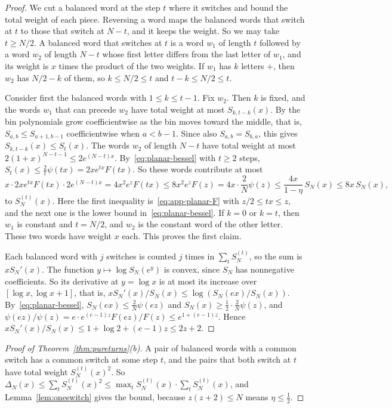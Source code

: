 \begin{proof}
We cut a balanced word at the step $t$ where it switches and bound the total weight of each piece.
Reversing a word maps the balanced words that switch at $t$ to those that switch at $N-t$, and it
keeps the weight. So we may take $t\ge N/2$. A balanced word that switches at $t$ is a word $w_1$
of length $t$ followed by a word $w_2$ of length $N-t$ whose first letter differs from the last
letter of $w_1$, and its weight is $x$ times the product of the two weights. If $w_1$ has $k$
letters $+$, then $w_2$ has $N/2-k$ of them, so $k\le N/2\le t$ and $t-k\le N/2\le t$.

Consider first the balanced words with $1\le k\le t-1$. Fix $w_2$. Then $k$ is fixed, and the
words $w_1$ that can precede $w_2$ have total weight at most $S_{k,t-k}(x)$. By
\cite[Proposition~4.1]{paperA} the bin polynomials grow coefficientwise as the bin moves toward the
middle, that is, $S_{a,b}\le S_{a+1,b-1}$ coefficientwise when $a<b-1$. Since also
$S_{a,b}=S_{b,a}$, this gives $S_{k,t-k}(x)\le S_t(x)$. The words $w_2$ of length $N-t$ have total
weight at most $2(1+x)^{N-t-1}\le2e^{(N-t)x}$. By~\eqref{eq:planar-bessel} with $t\ge2$ steps,
$S_t(x)\le\frac2t\psi(tx)=2xe^{tx}F(tx)$. So these words contribute at most
\[
 x\cdot2xe^{tx}F(tx)\cdot2e^{(N-t)x}=4x^2e^{z}F(tx)\le8x^2e^zF(z)=4x\cdot\frac2N\psi(z)
 \le\frac{4x}{1-\eta}\,S_N(x)\le8x\,S_N(x),
\]
to $S^{(t)}_N(x)$. Here the first inequality is~\eqref{eq:app-planar-F} with $z/2\le tx\le z$, and
the next one is the lower bound in~\eqref{eq:planar-bessel}. If $k=0$ or $k=t$, then $w_1$ is
constant and $t=N/2$, and $w_2$ is the constant word of the other letter. These two words have
weight $x$ each. This proves the first claim.

Each balanced word with $j$ switches is counted $j$ times in $\sum_tS^{(t)}_N$, so the sum is
$xS_N'(x)$. The function $y\mapsto\log S_N(e^y)$ is convex, since $S_N$ has nonnegative
coefficients. So its derivative at $y=\log x$ is at most its increase over $[\log x,\log x+1]$,
that is, $xS_N'(x)/S_N(x)\le\log(S_N(ex)/S_N(x))$. By~\eqref{eq:planar-bessel},
$S_N(ex)\le\frac2N\psi(ez)$ and $S_N(x)\ge\frac12\cdot\frac2N\psi(z)$, and
$\psi(ez)/\psi(z)=e\cdot e^{(e-1)z}F(ez)/F(z)\le e^{1+(e-1)z}$. Hence
$xS_N'(x)/S_N(x)\le1+\log2+(e-1)z\le2z+2$.
\end{proof}

\begin{proof}[Proof of Theorem~\ref{thm:pureturns}(b)]
A pair of balanced words with a common switch has a common switch at some step $t$, and the pairs
that both switch at $t$ have total weight $S^{(t)}_N(x)^2$. So
$\Delta_N(x)\le\sum_tS^{(t)}_N(x)^2\le\max_tS^{(t)}_N(x)\cdot\sum_tS^{(t)}_N(x)$, and
Lemma~\ref{lem:oneswitch} gives the bound, because $z(z+2)\le N$ means $\eta\le\frac12$.
\end{proof}

